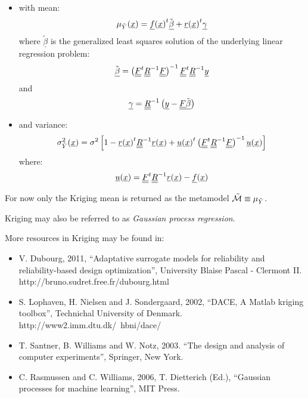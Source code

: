 {  \begin{itemize}
    \item with mean:
    \begin{equation}
      \mu_{\tilde{Y}}({\underline{x}}) = {{{\underline{f}}({\underline{x}})}^t} \tilde{{\underline{\beta}}} + {{{\underline{r}}({\underline{x}})}^t} {\underline{\gamma}}
    \end{equation}
    where $\underline{\tilde{\beta}}$ is the generalized least squares solution of the underlying linear regression problem:
    \begin{equation}
      \tilde{{\underline{\beta}}} = \left({{{\underline{\underline{F}}}}^t} {\underline{\underline{R}}}^{-1} {\underline{\underline{F}}}\right)^{-1} {{{\underline{\underline{F}}}}^t} {\underline{\underline{R}}}^{-1} {\underline{y}}
    \end{equation}
    and
    \begin{equation}
      {\underline{\gamma}} = {\underline{\underline{R}}}^{-1} \left({\underline{y}} - {\underline{\underline{F}}} \tilde{{\underline{\beta}}}\right)
    \end{equation}
    \item and variance:
    \begin{equation}
      \sigma^2_{\tilde{Y}}({\underline{x}}) =
        \sigma^2 \left[1 -
            {{{\underline{r}}({\underline{x}})}^t} {\underline{\underline{R}}}^{-1} {\underline{r}}({\underline{x}})
            + {{{\underline{u}}({\underline{x}})}^t} \left({{{\underline{\underline{F}}}}^t} {\underline{\underline{R}}}^{-1} {\underline{\underline{F}}}\right)^{-1} {\underline{u}}({\underline{x}})
            \right]
    \end{equation}
    where:
    \begin{equation}
      {\underline{u}}({\underline{x}}) = {{{\underline{\underline{F}}}}^t} {\underline{\underline{R}}}^{-1} {\underline{r}}({\underline{x}}) - {\underline{f}}({\underline{x}})
    \end{equation}
  \end{itemize}

  For now only the Kriging mean is returned as the metamodel $\tilde{{\mathcal M}} \equiv \mu_{\tilde{Y}}$.

}
{
  Kriging may also be referred to as \emph{Gaussian process regression}.
}

\Methodology{}
            {
              More resources in Kriging may be found in:
              \begin{itemize}
                \item V. Dubourg, 2011, ``Adaptative surrogate models for reliability and reliability-based design optimization'', University Blaise Pascal - Clermont II. http://bruno.sudret.free.fr/dubourg.html
                \item S. Lophaven, H. Nielsen and J. Sondergaard, 2002, ``DACE, A Matlab kriging toolbox'', Technichal University of Denmark. http://www2.imm.dtu.dk/~hbni/dace/              \item T. Santner, B. Williams and W. Notz, 2003. ``The design and analysis of computer experiments'', Springer, New York.
                \item C. Rasmussen and C. Williams, 2006, T. Dietterich (Ed.), ``Gaussian processes for machine learning'', MIT Press.
              \end{itemize}
            }
